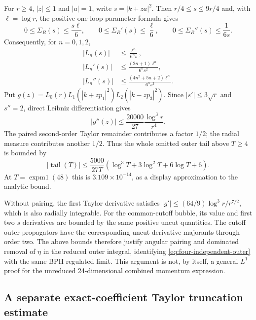For $r\geq4$, $|z|\leq1$ and $|a|=1$, write
$s=|k+za|^2$.  Then $r/4\leq s\leq9r/4$ and, with $\ell=\log r$,
the positive one-loop parameter formula gives
\begin{equation}
 0\leq\Sigma_R(s)\leq\frac{s\ell}{6},\qquad
 0\leq\Sigma_R'(s)\leq\frac\ell6,\qquad
 0\leq\Sigma_R''(s)\leq\frac1{6s}.
\end{equation}
Consequently, for $n=0,1,2$,
\begin{align}
 |L_n(s)|&\leq\frac{\ell^n}{6^n s},\\
 |L_n'(s)|&\leq\frac{(2n+1)\ell^n}{6^n s^2},\\
 |L_n''(s)|&\leq\frac{(4n^2+5n+2)\ell^n}{6^n s^3}.
 \label{eq:four-independent-line-bounds}
\end{align}
Put $g(z)=L_0(r)L_1(|k+zp_1|^2)L_2(|k-zp_3|^2)$.
Since $|s'|\leq3\sqrt r$ and $s''=2$, direct Leibniz differentiation gives
\begin{equation}
 |g''(z)|\leq\frac{20000}{27}\frac{\log^3r}{r^4}.
\end{equation}
The paired second-order Taylor remainder contributes a factor $1/2$;
the radial measure contributes another $1/2$.  Thus the whole omitted
outer tail above $T\geq4$ is bounded by
\begin{equation}
 |\operatorname{tail}(T)|\leq\frac{5000}{27T}
 \left(\log^3T+3\log^2T+6\log T+6\right).
 \label{eq:four-independent-tail}
\end{equation}
At $T=\operatorname{expm1}(48)$ this is
$3.109\times10^{-14}$, as a display approximation to the analytic bound.

Without pairing, the first Taylor derivative satisfies
$|g'|\leq(64/9)\log^3r/r^{7/2}$, which is also radially integrable.
For the common-cutoff bubble, its value and first two $s$ derivatives are
bounded by the same positive uncut quantities.  The cutoff outer
propagators have the corresponding uncut derivative majorants through
order two.  The above bounds therefore justify angular pairing and
dominated removal of $\eta$ in the reduced outer integral, identifying
\eqref{eq:four-independent-outer} with the same BPH regulated limit.
This argument is not, by itself, a general $L^1$ proof for the unreduced
24-dimensional combined momentum expression.

\subsection{A separate exact-coefficient Taylor truncation estimate}

